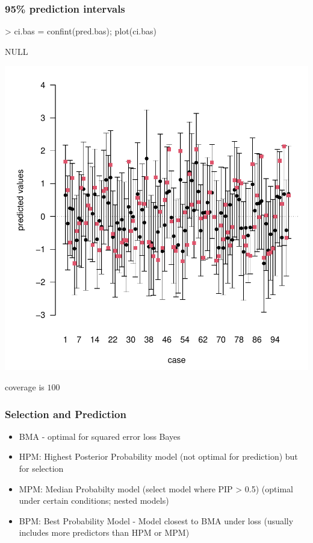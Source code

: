 \documentclass[]{beamer}
\begin{document}
\begin{frame}[fragile]\frametitle{95\% prediction intervals}
\begin{Schunk}
\begin{Sinput}
> ci.bas = confint(pred.bas); plot(ci.bas)
\end{Sinput}
\begin{Soutput}
NULL
\end{Soutput}
\end{Schunk}
\includegraphics{16-prior-bma-006}


coverage is  $100$



\end{frame}

\begin{frame}\frametitle{Selection and Prediction}

\begin{itemize}
  \item  BMA  - optimal for squared error loss Bayes
  \item  HPM: Highest Posterior Probability model (not optimal for prediction) but for selection

\item MPM: Median Probabilty model (select model where PIP > 0.5)
 (optimal under certain conditions; nested models)

\item BPM: Best Probability Model - Model closest to BMA under loss
      (usually includes more predictors than HPM or MPM)
\end{itemize}

\end{frame}
\end{document}
